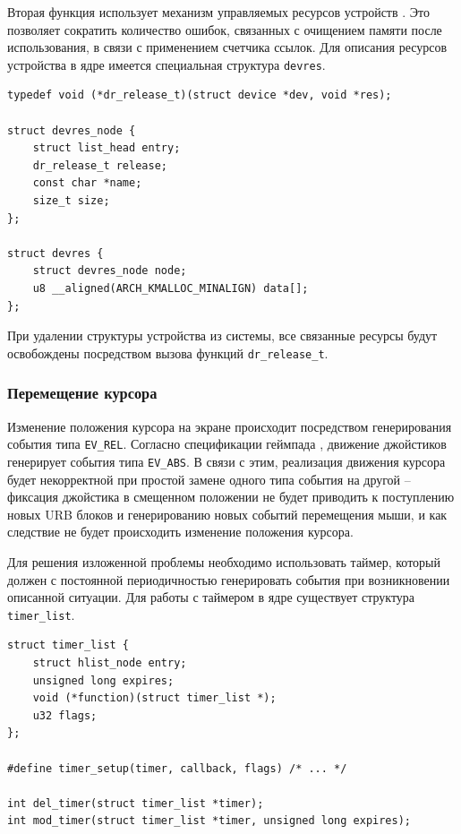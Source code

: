 Вторая функция использует механизм управляемых ресурсов устройств \cite{devres}. Это позволяет сократить количество ошибок, связанных с очищением памяти после использования, в связи с применением счетчика ссылок. Для описания ресурсов устройства в ядре имеется специальная структура \texttt{devres}.

\begin{small}
\begin{verbatim}
typedef void (*dr_release_t)(struct device *dev, void *res);

struct devres_node {
    struct list_head entry;
    dr_release_t release;
    const char *name;
    size_t size;
};

struct devres {
    struct devres_node node;
    u8 __aligned(ARCH_KMALLOC_MINALIGN) data[];
};
\end{verbatim}
\end{small}

При удалении структуры устройства из системы, все связанные ресурсы будут освобождены посредством вызова функций \texttt{dr\_release\_t}.

\subsubsection{Перемещение курсора}

Изменение положения курсора на экране происходит посредством генерирования события типа \texttt{EV\_REL}. Согласно спецификации геймпада \cite{gamepad-spec}, движение джойстиков генерирует события типа \texttt{EV\_ABS}. В связи с этим, реализация движения курсора будет некорректной при простой замене одного типа события на другой -- фиксация джойстика в смещенном положении не будет приводить к поступлению новых URB блоков и генерированию новых событий перемещения мыши, и как следствие не будет происходить изменение положения курсора.

Для решения изложенной проблемы необходимо использовать таймер, который должен с постоянной периодичностью генерировать события при возникновении описанной ситуации. Для работы с таймером в ядре существует структура \texttt{timer\_list}.

\begin{small}
\begin{verbatim}
struct timer_list {
    struct hlist_node entry;
    unsigned long expires;
    void (*function)(struct timer_list *);
    u32	flags;
};

#define timer_setup(timer, callback, flags) /* ... */

int del_timer(struct timer_list *timer);
int mod_timer(struct timer_list *timer, unsigned long expires);
\end{verbatim}
\end{small}

